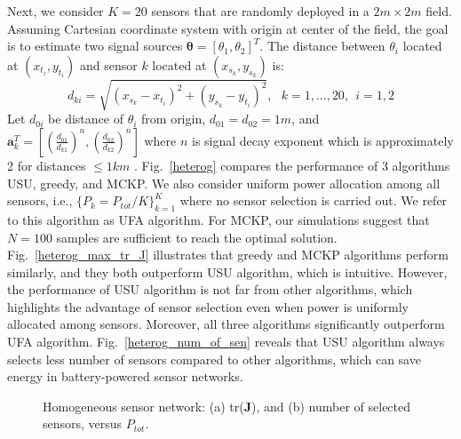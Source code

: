 \documentclass[conference]{IEEEtran}
\begin{document}
Next, we consider $K\!=\!20$ sensors that are randomly deployed in a $2m\times2m$ field. Assuming Cartesian coordinate system with origin at center of the field, the goal is to estimate two signal sources $\boldsymbol{\theta}=\left[\theta_1,\theta_2\right]^T$. The distance between $\theta_i$ located at $(x_{t_i},y_{t_i})$ and sensor $k$ located at $(x_{s_k},y_{s_k})$ is: 
%
\begin{equation*}
d_{ki}=\sqrt{(x_{s_k}-x_{t_i})^2+(y_{s_k}-y_{t_i})^2}, \ \ \ k=1,..., 20, \ \ i=1,2
\end{equation*}
Let $d_{0i}$ be distance of $\theta_i$ from origin, $d_{01}=d_{02}=1m$, and 
%
% 
$\mathbf{a}_k^T=[(\frac{d_{01}}{d_{k1}})^n, (\frac{d_{02}}{d_{k2}})^n]$ where $n$ is signal decay exponent which is approximately 2 for distances $\leq\!1km$ \cite{Li_Eurasip_2003}. Fig.~\ref{heterog} compares the performance of 3 algorithms USU, greedy, and MCKP. We also consider uniform power allocation among all sensors, i.e., $\{P_k=P_{tot}/K\}_{k=1}^K$ where no sensor selection is carried out. We refer to this algorithm as UFA algorithm. For MCKP, our simulations suggest that $N=100$ samples are sufficient to reach the optimal solution. Fig.~\ref{heterog_max_tr_J} illustrates that greedy and MCKP algorithms perform similarly, and they both outperform USU algorithm, which is intuitive. However, the performance of USU algorithm is not far from other algorithms, which highlights the advantage of sensor selection even when power is uniformly allocated among sensors. Moreover, all three algorithms significantly outperform UFA algorithm. Fig.~\ref{heterog_num_of_sen} reveals that USU algorithm always selects less number of sensors compared to other algorithms, which can save energy in battery-powered sensor networks. 
%
\begin{figure}[h]
	\centering
	\caption{Homogeneous sensor network: (a) tr($\boldsymbol{J}$), and (b) number of selected sensors, versus $P_{tot}$.}  
	\label{homog} 
\end{figure}
\end{document}
